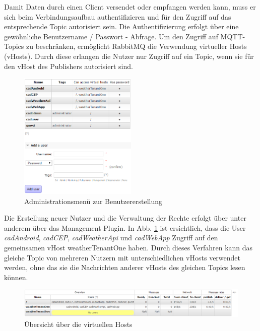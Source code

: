 Damit Daten durch einen Client versendet oder empfangen werden kann, muss er sich beim Verbindungsaufbau authentifizieren und für den Zugriff auf das entsprechende Topic autorisiert sein. Die Authentifizierung erfolgt über eine gewöhnliche Benutzername / Passwort - Abfrage. Um den Zugriff auf MQTT-Topics zu beschränken, ermöglicht RabbitMQ die Verwendung virtueller Hosts (vHosts). Durch diese erlangen die Nutzer nur Zugriff auf ein Topic, wenn sie für den vHost des Publishers autorisiert sind. 
\begin{figure}[htbp]
	\centering
	\includegraphics[width=0.5\textwidth]{Bilder/createUser.png}
	\caption{Administrationsmenü zur Benutzererstellung }
	\label{img:AdminCreateUser}
\end{figure}
Die Erstellung neuer Nutzer und die Verwaltung der Rechte erfolgt über unter anderem über das Management Plugin. In Abb. \ref{img:AdminCreateUser} ist ersichtlich, dass die User \textit{cadAndroid}, \textit{cadCEP}, \textit{cadWeatherApi} und \textit{cadWebApp} Zugriff auf den gemeinsamen vHost weatherTenantOne haben. Durch dieses Verfahren kann das gleiche Topic von mehreren Nutzern mit unterschiedlichen vHosts verwendet werden, ohne das sie die Nachrichten anderer vHosts des gleichen Topics lesen können. 
\begin{figure}[htbp]
	\centering
	\includegraphics[width=1.0\textwidth]{Bilder/vHostsOverview.png}
	\caption{Übersicht über die virtuellen Hosts}
	\label{img:vHostOverview}
\end{figure}
